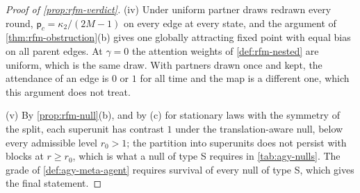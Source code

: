 \begin{proof}[Proof of \cref{prop:rfm-verdict}]
(iv) Under uniform partner draws redrawn every round, $\mathsf p_c=\kappa_2/(2M-1)$ on every edge at every state, and the argument of \cref{thm:rfm-obstruction}(b) gives one globally attracting fixed point with equal bias on all parent edges. At $\gamma=0$ the attention weights of \cref{def:rfm-nested} are uniform, which is the same draw. With partners drawn once and kept, the attendance of an edge is $0$ or $1$ for all time and the map is a different one, which this argument does not treat.

(v) By \cref{prop:rfm-null}(b), and by (c) for stationary laws with the symmetry of the split, each superunit has contrast $1$ under the translation-aware null, below every admissible level $r_0>1$; the partition into superunits does not persist with blocks at $r\ge r_0$, which is what a null of type S requires in \cref{tab:agy-nulls}. The grade of \cref{def:agy-meta-agent} requires survival of every null of type S, which gives the final statement.
\end{proof}
